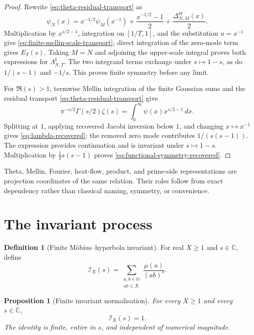 \documentclass[11pt,a4paper]{article}
\newtheorem{proposition}[theorem]{Proposition}
\theoremstyle{definition}
\newtheorem{definition}[theorem]{Definition}
\newcommand{\N}{\mathbb{N}}
\newcommand{\C}{\mathbb{C}}
\newcommand{\Invariant}{\mathcal{I}}
\begin{document}
\begin{proof}
Rewrite \cref{eq:theta-residual-transport} as
\[
  \psi_N(x)
  =
  x^{-1/2}\psi_M(x^{-1})
  +\frac{x^{-1/2}-1}{2}
  +\frac{\Delta_{N,M}^{\Theta}(x)}2.
\]
Multiplication by $x^{s/2-1}$, integration on $[1/T,1]$, and the substitution
$u=x^{-1}$ give \cref{eq:finite-mellin-scale-transport}; direct integration of
the zero-mode term gives $E_T(s)$. Taking $M=N$ and adjoining the upper-scale
integral proves both expressions for $\Lambda^\sharp_{N,T}$. The two integrand
terms exchange under $s\mapsto1-s$, as do $1/(s-1)$ and $-1/s$. This proves
finite symmetry before any limit.

For $\Re(s)>1$, termwise Mellin integration of the finite Gaussian sums and
the residual transport \cref{eq:theta-residual-transport} give
\[
  \pi^{-s/2}\Gamma(s/2)\zeta(s)
  =\int_0^\infty\psi(x)x^{s/2-1}\,dx.
\]
Splitting at $1$, applying recovered Jacobi inversion below $1$, and changing
$x\mapsto x^{-1}$ gives \cref{eq:lambda-recovered}; the removed zero mode
contributes $1/(s(s-1))$. The expression provides continuation and is invariant
under $s\mapsto1-s$. Multiplication by
$\tfrac12s(s-1)$ proves \cref{eq:functional-symmetry-recovered}.
\end{proof}

Theta, Mellin, Fourier, heat-flow, product, and prime-side representations are
projection coordinates of the same relation. Their roles follow from exact
dependency rather than classical naming, symmetry, or convenience.

\section{The invariant process}
\label{sec:process-invariant}

\begin{definition}[Finite Möbius--hyperbola invariant]
\label{def:finite-moebius-hyperbola}
For real $X\geq1$ and $s\in\C$, define
\begin{equation}
\label{eq:finite-moebius-hyperbola}
  \Invariant_X(s)
  =
  \sum_{\substack{a,b\in\N\\ab\leq X}}
  \frac{\mu(a)}{(ab)^s}.
\end{equation}
\end{definition}

\begin{proposition}[Finite invariant normalisation]
\label{prop:finite-moebius-hyperbola}
For every $X\geq1$ and every $s\in\C$,
\begin{equation}
\label{eq:finite-invariant-normalisation}
  \Invariant_X(s)=1.
\end{equation}
The identity is finite, entire in $s$, and independent of numerical magnitude.
\end{proposition}
\end{document}
